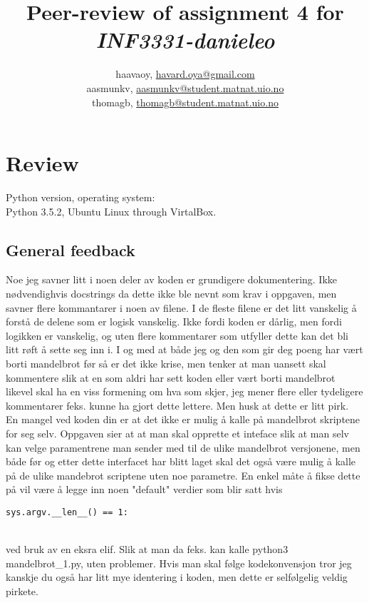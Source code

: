 \documentclass[a4paper]{article}
\title{Peer-review of assignment 4 for \textit{INF3331-danieleo}}
\author{haavaoy, \url{havard.oya@gmail.com} \\
 		aasmunkv, \url{aasmunkv@student.matnat.uio.no} \\
		thomagb, \url{thomagb@student.matnat.uio.no}}
\begin{document}
\maketitle


\section{Review \emph{}}\label{sec:review}

Python version, operating system:\\
Python 3.5.2, Ubuntu Linux through VirtalBox.

\subsection*{General feedback}
Noe jeg savner litt i noen deler av koden er grundigere dokumentering. Ikke nødvendighvis docstrings da
dette ikke ble nevnt som krav i oppgaven, men savner flere kommantarer i noen av filene. I de fleste filene er det
litt vanskelig å forstå de delene som er logisk vanskelig. Ikke fordi koden er dårlig, men fordi logikken er
vanskelig, og uten flere kommentarer som utfyller dette kan det bli litt røft å sette seg inn i. I og
med at både jeg og den som gir deg poeng har vært borti mandelbrot før så er det ikke krise, men tenker at
man uansett skal kommentere slik at en som aldri har sett koden eller vært borti mandelbrot likevel skal ha
en viss formening om hva som skjer, jeg mener flere eller tydeligere kommentarer feks. kunne ha gjort dette
lettere. Men husk at dette er litt pirk.\\
En mangel ved koden din er at det ikke er mulig å kalle på mandelbrot skriptene for seg selv. Oppgaven
sier at at man skal opprette et inteface slik at man selv kan velge paramentrene man sender med til de ulike
mandelbrot versjonene, men både før og etter dette interfacet har blitt laget skal det også være mulig å
kalle på de ulike mandebrot scriptene uten noe parametre. En enkel måte å fikse dette på vil være å legge
inn noen "default" verdier som blir satt hvis 
\begin{verbatim}
sys.argv.__len__() == 1:
\end{verbatim} 
\\ved bruk av en eksra elif.
Slik at man da feks. kan kalle python3 mandelbrot\_1.py, uten problemer. Hvis man skal følge kodekonvensjon tror jeg kanskje du også har litt mye identering i koden, men dette er selfølgelig veldig pirkete.
\end{document}
